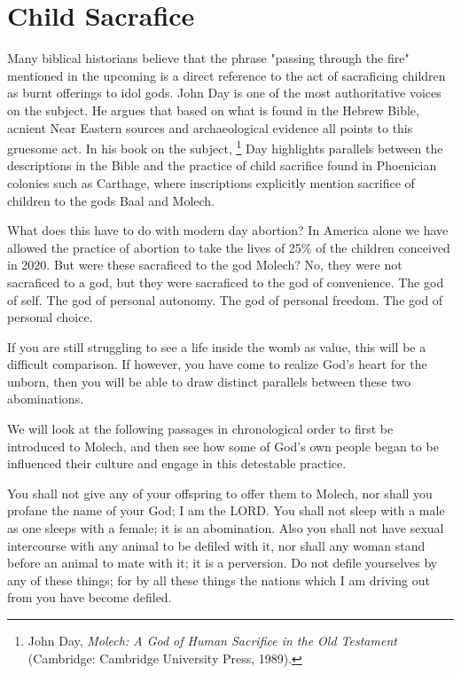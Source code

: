 \chapter{Child Sacrafice}

Many biblical historians believe that the phrase "passing through the fire" mentioned in the upcoming is a direct reference to the act of sacraficing children
as burnt offerings to idol gods. John Day is one of the most authoritative voices on the subject. He argues that based on what is found in the Hebrew Bible, acnient Near Eastern sources and archaeological evidence 
all points to this gruesome act. In his book on the subject, \footnote{John Day, \textit{Molech: A God of Human Sacrifice in the Old Testament} (Cambridge: Cambridge University Press, 1989).} Day highlights parallels between the descriptions
in the Bible and the practice of child sacrifice found in Phoenician colonies such as Carthage, where inscriptions explicitly mention sacrifice of children to the gods Baal and Molech. 

What does this have to do with modern day abortion? In America alone we have allowed the practice of abortion to take the lives of 25\% of the children conceived in 2020. But were these
sacraficed to the god Molech? No, they were not sacraficed to a god, but they were sacraficed to the god of convenience. The god of self. The god of personal autonomy. The god of personal freedom. The god of personal choice.

If you are still struggling to see a life inside the womb as value, this will be a difficult comparison. If however, you have come to realize God's heart for the unborn, then you will be able to draw distinct parallels between these two abominations.

\pagebreak

We will look at the following passages 
in chronological order to first be introduced to Molech, and then see how some of God's own people began to be influenced their culture and engage in this detestable practice.

\vspace{2\baselineskip}

\begin{scripture}[Leviticus 18:21-24]
    You shall not give any of your offspring to offer them to Molech, nor shall you profane the name of your God; I am the LORD.
    You shall not sleep with a male as one sleeps with a female; it is an abomination.
    Also you shall not have sexual intercourse with any animal to be defiled with it, nor shall any woman stand before an animal to mate with it; it is a perversion.
    Do not defile yourselves by any of these things; for by all these things the nations which I am driving out from you have become defiled.
\end{scripture}

